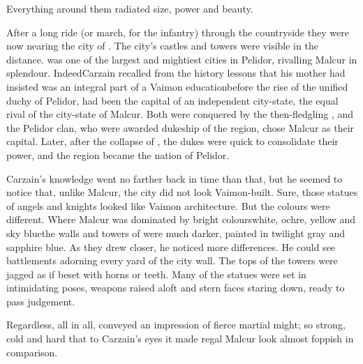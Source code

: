 Everything around them radiated size, power and beauty. 

After a long ride (or march, for the infantry) through the countryside they were now nearing the city of \Forklin{}. 
The city's castles and towers were visible in the distance. %
\Forklin{} was one of the largest and mightiest cities in Pelidor, rivalling Malcur in splendour. 
Indeed\dash Carzain recalled from the history lessons that his mother had insisted was an integral part of a Vaimon education\dash before the rise of the unified duchy of Pelidor, \Forklin{} had been the capital of an independent city-state, the equal rival of the city-state of Malcur. 
Both were conquered by the then-fledgling \GreatBelkade, and the Pelidor clan, who were awarded dukeship of the region, chose Malcur as their capital. Later, after the collapse of \theBelkadianEmpire, the dukes were quick to consolidate their power, and the region became the nation of Pelidor. 

Carzain's knowledge went no farther back in time than that, but he seemed to notice that, unlike Malcur, the city did not look Vaimon-built. 
Sure, those statues of angels and knights looked like Vaimon architecture. 
But the colours were different. 
Where Malcur was dominated by bright colours\dash white, ochre, yellow and sky blue\dash the walls and towers of \Forklin{} were much darker, painted in twilight gray and sapphire blue. 
As they drew closer, he noticed more differences. 
He could see battlements adorning every yard of the city wall. 
The tops of the towers were jagged as if beset with horns or teeth. 
Many of the statues were set in intimidating poses, weapons raised aloft and stern faces staring down, ready to pass judgement. 


Regardless, all in all, \Forklin{} conveyed an impression of fierce martial might; so strong, cold and hard that to Carzain's eyes it made regal Malcur look almost foppish in comparison. 










\begin{comment}
\subsection{Moral support}
\end{comment}

